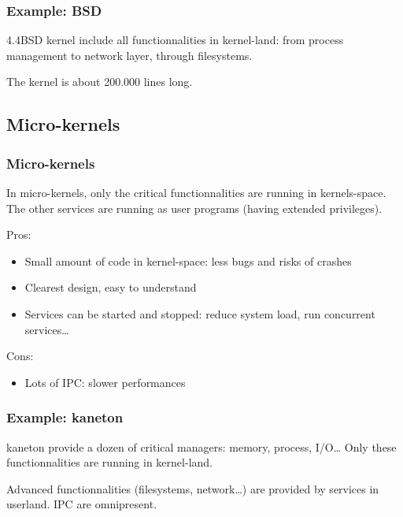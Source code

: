 %
%

\begin{frame}
  \frametitle{Example: BSD}

  4.4BSD kernel include all functionnalities in kernel-land: from
    process management to network layer, through filesystems.

  \begin{center}
  \end{center}

  The kernel is about 200.000 lines long.

\end{frame}

%
%

\subsection{Micro-kernels}

%
%

\begin{frame}
  \frametitle{Micro-kernels}

  In micro-kernels, only the critical functionnalities are running in
  kernels-space. The other services are running as user programs
  (having extended privileges).

  \-

  Pros:

  \begin{itemize}
  \item
    Small amount of code in kernel-space: less bugs and risks of
    crashes
  \item
    Clearest design, easy to understand
  \item
    Services can be started and stopped: reduce system load, run
    concurrent services\ldots
  \end{itemize}

  \-

  Cons:

  \begin{itemize}
  \item
    Lots of IPC: slower performances
  \end{itemize}

\end{frame}

%
%

\begin{frame}
  \frametitle{Example: kaneton}

  kaneton provide a dozen of critical managers: memory, process,
  I/O\ldots{} Only these functionnalities are running in kernel-land.

  \begin{center}
  \end{center}

  Advanced functionnalities (filesystems, network\ldots) are provided
  by services in userland. IPC are omnipresent.

\end{frame}

